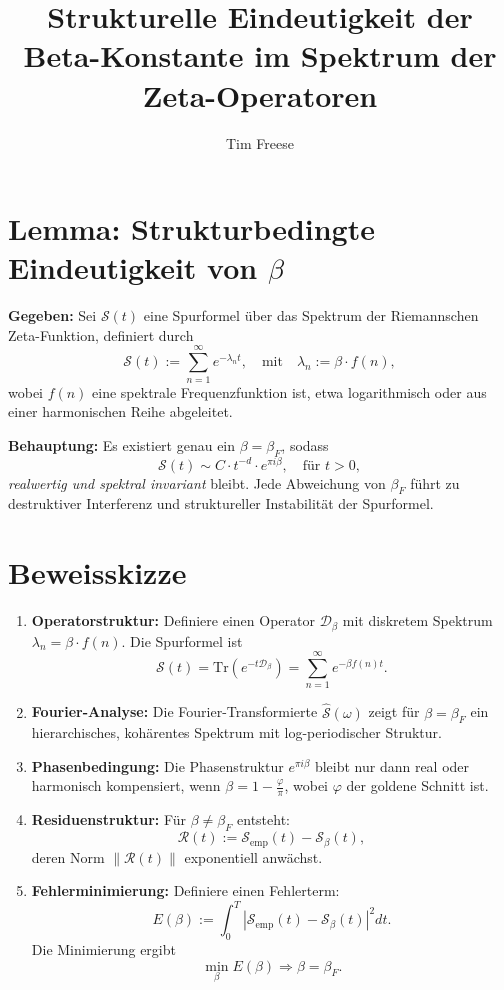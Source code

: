 \documentclass[12pt]{article}
\title{Strukturelle Eindeutigkeit der Beta-Konstante im Spektrum der Zeta-Operatoren}
\author{Tim Freese}
\date{}
\begin{document}
\maketitle

\section*{Lemma: Strukturbedingte Eindeutigkeit von \(\beta\)}

\textbf{Gegeben:}  
Sei \(\mathcal{S}(t)\) eine Spurformel über das Spektrum der Riemannschen Zeta-Funktion, definiert durch
\[
\mathcal{S}(t) := \sum_{n=1}^\infty e^{-\lambda_n t}, \quad \text{mit} \quad \lambda_n := \beta \cdot f(n),
\]
wobei \(f(n)\) eine spektrale Frequenzfunktion ist, etwa logarithmisch oder aus einer harmonischen Reihe abgeleitet.

\textbf{Behauptung:}  
Es existiert genau ein \(\beta = \beta_F\), sodass
\[
\mathcal{S}(t) \sim C \cdot t^{-d} \cdot e^{\pi i \beta}, \quad \text{für } t > 0,
\]
\emph{realwertig und spektral invariant} bleibt. Jede Abweichung von \(\beta_F\) führt zu destruktiver Interferenz und struktureller Instabilität der Spurformel.

\section*{Beweisskizze}

\begin{enumerate}
    \item \textbf{Operatorstruktur:}  
    Definiere einen Operator \(\mathcal{D}_\beta\) mit diskretem Spektrum \(\lambda_n = \beta \cdot f(n)\). Die Spurformel ist
    \[
    \mathcal{S}(t) = \mathrm{Tr}(e^{-t \mathcal{D}_\beta}) = \sum_{n=1}^\infty e^{-\beta f(n) t}.
    \]

    \item \textbf{Fourier-Analyse:}  
    Die Fourier-Transformierte \(\widehat{\mathcal{S}}(\omega)\) zeigt für \(\beta = \beta_F\) ein hierarchisches, kohärentes Spektrum mit log-periodischer Struktur.

    \item \textbf{Phasenbedingung:}  
    Die Phasenstruktur \(e^{\pi i \beta}\) bleibt nur dann real oder harmonisch kompensiert, wenn \(\beta = 1 - \frac{\varphi}{\pi}\), wobei \(\varphi\) der goldene Schnitt ist.

    \item \textbf{Residuenstruktur:}  
    Für \(\beta \neq \beta_F\) entsteht:
    \[
    \mathcal{R}(t) := \mathcal{S}_\text{emp}(t) - \mathcal{S}_\beta(t),
    \]
    deren Norm \(\| \mathcal{R}(t) \|\) exponentiell anwächst.

    \item \textbf{Fehlerminimierung:}  
    Definiere einen Fehlerterm:
    \[
    E(\beta) := \int_0^T |\mathcal{S}_\text{emp}(t) - \mathcal{S}_\beta(t)|^2 dt.
    \]
    Die Minimierung ergibt
    \[
    \min_\beta E(\beta) \Rightarrow \beta = \beta_F.
    \]
\end{enumerate}
\end{document}
